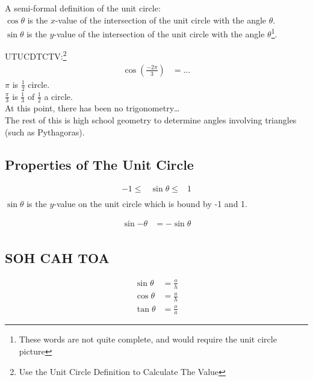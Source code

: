 A semi-formal definition of the unit circle:\\
$\cos{\theta}$ is the $x$-value of the intersection of the unit circle with the
angle $\theta$.\\
$\sin{\theta}$ is the $y$-value of the intersection of the unit circle with the
angle $\theta$\footnote{These words are not quite complete, and would require
the unit circle picture}.

UTUCDTCTV:\footnote{Use the Unit Circle Definition to Calculate The Value}
\begin{align}
  \cos(\frac{-2\pi}{3}) & = \ldots
\end{align}
$\pi$ is $\frac{1}{2}$ circle.\\
$\frac{\pi}{3}$ is $\frac{1}{3}$ of $\frac{1}{2}$ a circle.\\
At this point, there has been no trigonometry\ldots \\
The rest of this is high school geometry to determine angles involving
triangles (such as Pythagoras).

\subsection{Properties of The Unit Circle}
\label{sec:Properties of The Unit Circle}

\begin{align}
  -1 \leq & \sin{\theta} \leq & 1 \\
\end{align}
$\sin{\theta}$ is the $y$-value on the unit circle which is bound by -1 and 1.

\begin{align}
  \sin{-\theta} & = -\sin{\theta} \\
\end{align}

\subsection{SOH CAH TOA}
\label{sec:SOHCAHTOA}
\begin{align}
  \sin{\theta} & = \frac{o}{h} \\
  \cos{\theta} & = \frac{a}{h} \\
  \tan{\theta} & = \frac{o}{a}
\end{align}

